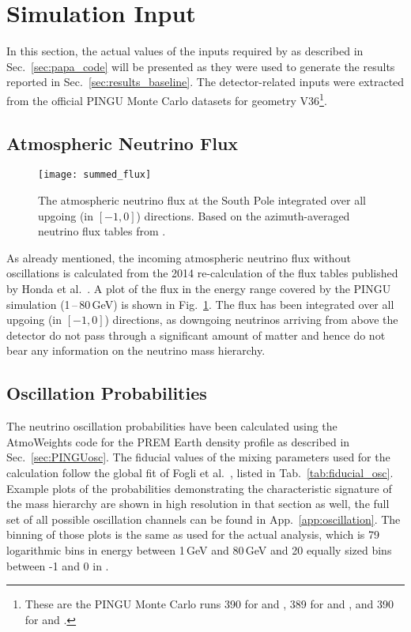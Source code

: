 \section{Simulation Input}
\label{sec:sim_input}

In this section, the actual values of the inputs required by \papa as described
in Sec.~\ref{sec:papa_code} will be presented as they were used to generate the
results reported in Sec.~\ref{sec:results_baseline}. The detector-related
inputs were extracted from the official PINGU Monte Carlo datasets for geometry
V36\footnote{These are the PINGU Monte Carlo runs 390 for \nue and \nuebar, 389
for \numu and \numubar, and 390 for \nutau and \nutaubar.}.

\subsection{Atmospheric Neutrino Flux}
\label{sec:input_flux}

\begin{figure}[htbp]
 \centering
 \texttt{[image: summed\_flux]}
 \caption{The atmospheric neutrino flux at the South Pole integrated over all
          upgoing (\coszen in $[-1,0]$) directions. Based on the
          azimuth-averaged neutrino flux tables from \cite{HondaSP}.}
\label{fig:summed_flux}
\end{figure}

As already mentioned, the incoming atmospheric neutrino flux without
oscillations is calculated from the 2014 re-calculation of the flux tables
published by Honda et al.\ \cite{Honda, HondaSP}. A plot of the flux in the
energy range covered by the PINGU simulation (1\,--\,80\,GeV) is shown in
Fig.~\ref{fig:summed_flux}. The flux has been integrated over all upgoing
(\coszen in $[-1,0]$) directions, as downgoing neutrinos arriving from above
the detector do not pass through a significant amount of matter and hence do
not bear any information on the neutrino mass hierarchy.

\subsection{Oscillation Probabilities}
\label{sec:input_osc}

The neutrino oscillation probabilities have been calculated using the
AtmoWeights code for the PREM Earth density profile as described in
Sec.~\ref{sec:PINGUosc}. The fiducial values of the mixing parameters used for
the calculation follow the global fit of Fogli et al.\ \cite{Fogli}, listed in
Tab.~\ref{tab:fiducial_osc}. Example plots of the probabilities demonstrating
the characteristic signature of the mass hierarchy are shown in high resolution
in that section as well, the full set of all possible oscillation channels can
be found in App.~\ref{app:oscillation}. The binning of those plots is the same
as used for the actual analysis, which is 79 logarithmic bins in energy between
1\,GeV and 80\,GeV and 20 equally sized bins between -1 and 0 in \coszen.

